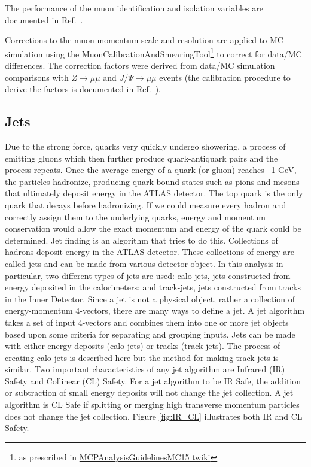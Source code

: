 The performance of the muon identification and isolation variables are documented in Ref.~\cite{Aad:2016jkr}.

Corrections to the muon momentum scale and resolution are applied to MC simulation using the MuonCalibrationAndSmearingTool\footnote{as prescribed 
in \href{https://twiki.cern.ch/twiki/bin/view/AtlasProtected/MCPAnalysisGuidelinesMC15\#Muon_momentum_scale_and_resoluti} {MCPAnalysisGuidelinesMC15 twiki}} 
to correct for  data/MC differences. The correction factors were derived from data/MC 
simulation comparisons with $Z\to \mu \mu$ and $J/\Psi \to \mu \mu$ events (the calibration procedure to derive the factors 
is documented in Ref.~\cite{Aad:2016jkr}).
\subsection{Jets}
Due to the strong force, quarks very quickly undergo showering, a process of emitting gluons which then further produce quark-antiquark pairs and the process repeats. Once the average energy of a quark (or gluon) reaches ~1 GeV, the particles hadronize, producing quark bound states such as pions and mesons that ultimately deposit energy in the ATLAS detector. The top quark is the only quark that decays before hadronizing. If we could measure every hadron and correctly assign them to the underlying quarks, energy and momentum conservation would allow the exact momentum and energy of the quark could be determined. Jet finding is an algorithm that tries to do this. Collections of hadrons deposit energy in the ATLAS detector. These collections of energy are called jets and can be made from various detector object. In this analysis in particular, two different types of jets are used: calo-jets, jets constructed from energy deposited in the calorimeters; and track-jets, jets constructed from tracks in the Inner Detector. \newline
\indent Since a jet is not a physical object, rather a collection of energy-momentum 4-vectors, there are many ways to define a jet. A jet algorithm takes a set of input 4-vectors and combines them into one or more jet objects based upon some criteria for separating and grouping inputs. Jets can be made with either energy deposits (calo-jets) or tracks (track-jets). The process of creating calo-jets is described here but the method for making track-jets is similar.  Two important characteristics of any jet algorithm are Infrared (IR) Safety and Collinear (CL) Safety. For a jet algorithm to be IR Safe, the addition or subtraction of small energy deposits will not change the jet collection. A jet algorithm is CL Safe if splitting or merging high transverse momentum particles does not change the jet collection. Figure \ref{fig:IR_CL} illustrates both IR and CL Safety.

